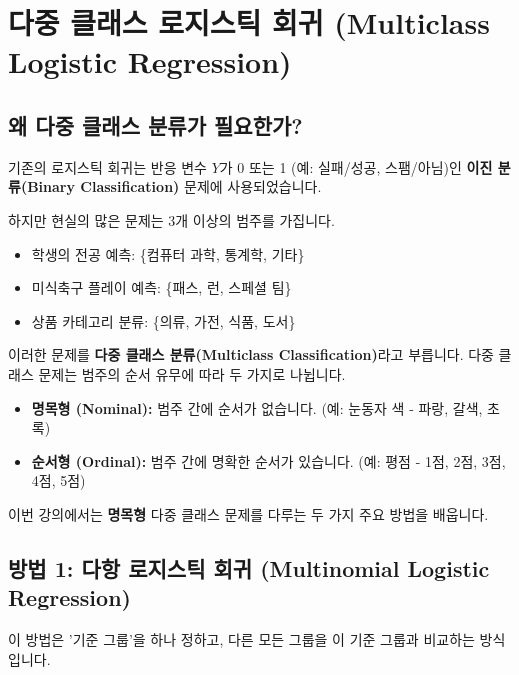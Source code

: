 \documentclass[11pt,a4paper]{book}
\theoremstyle{definition}
\begin{document}
\section{다중 클래스 로지스틱 회귀 (Multiclass Logistic Regression)}

\subsection{왜 다중 클래스 분류가 필요한가?}

기존의 로지스틱 회귀는 반응 변수 $Y$가 0 또는 1 (예: 실패/성공, 스팸/아님)인 \textbf{이진 분류(Binary Classification)} 문제에 사용되었습니다.

하지만 현실의 많은 문제는 3개 이상의 범주를 가집니다.
\begin{itemize}
    \item 학생의 전공 예측: \{컴퓨터 과학, 통계학, 기타\}
    \item 미식축구 플레이 예측: \{패스, 런, 스페셜 팀\}
    \item 상품 카테고리 분류: \{의류, 가전, 식품, 도서\}
\end{itemize}

이러한 문제를 \textbf{다중 클래스 분류(Multiclass Classification)}라고 부릅니다. 다중 클래스 문제는 범주의 순서 유무에 따라 두 가지로 나뉩니다.

\begin{itemize}
    \item \textbf{명목형 (Nominal):} 범주 간에 순서가 없습니다. (예: 눈동자 색 - 파랑, 갈색, 초록)
    \item \textbf{순서형 (Ordinal):} 범주 간에 명확한 순서가 있습니다. (예: 평점 - 1점, 2점, 3점, 4점, 5점)
\end{itemize}
이번 강의에서는 \textbf{명목형} 다중 클래스 문제를 다루는 두 가지 주요 방법을 배웁니다.

\subsection{방법 1: 다항 로지스틱 회귀 (Multinomial Logistic Regression)}

이 방법은 '기준 그룹'을 하나 정하고, 다른 모든 그룹을 이 기준 그룹과 비교하는 방식입니다.
\end{document}
